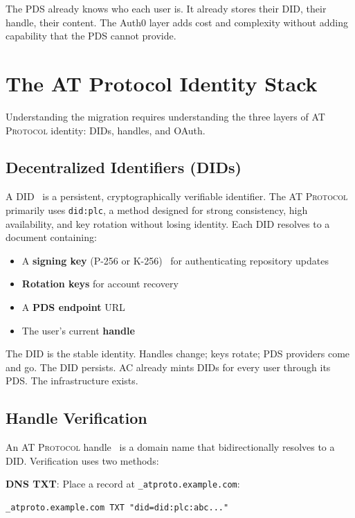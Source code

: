 \documentclass[10pt,letterpaper,twocolumn]{article}
\newcommand{\atproto}{\textsc{AT Protocol}}
\begin{document}
The PDS already knows who each user is. It already stores their DID, their handle, their content. The Auth0 layer adds cost and complexity without adding capability that the PDS cannot provide.


\section{The AT Protocol Identity Stack}
\label{sec:atproto}

Understanding the migration requires understanding the three layers of \atproto{} identity: DIDs, handles, and OAuth.

\subsection{Decentralized Identifiers (DIDs)}

A DID~\citep{w3cdid2022, atproto2024did} is a persistent, cryptographically verifiable identifier. The \atproto{} primarily uses \texttt{did:plc}, a method designed for strong consistency, high availability, and key rotation without losing identity. Each DID resolves to a document containing:

\begin{itemize}
  \item A \textbf{signing key} (P-256 or K-256)~\citep{atproto2024crypto} for authenticating repository updates
  \item \textbf{Rotation keys} for account recovery
  \item A \textbf{PDS endpoint} URL
  \item The user's current \textbf{handle}
\end{itemize}

The DID is the stable identity. Handles change; keys rotate; PDS providers come and go. The DID persists. AC already mints DIDs for every user through its PDS. The infrastructure exists.

\subsection{Handle Verification}

An \atproto{} handle~\citep{atproto2024handle} is a domain name that bidirectionally resolves to a DID. Verification uses two methods:

\textbf{DNS TXT}: Place a record at \texttt{\_atproto.example.com}:
\begin{lstlisting}
_atproto.example.com TXT "did=did:plc:abc..."
\end{lstlisting}
\end{document}
